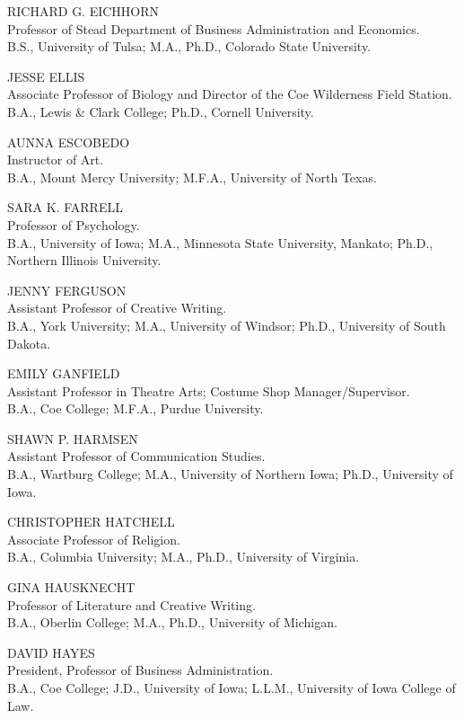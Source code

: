\documentclass[
  letterpaper,
]{scrbook}
\begin{document}
RICHARD G. EICHHORN\\
Professor of Stead Department of Business Administration and
Economics.\\
B.S., University of Tulsa; M.A., Ph.D., Colorado State University.

JESSE ELLIS\\
Associate Professor of Biology and Director of the Coe Wilderness Field
Station.\\
B.A., Lewis \& Clark College; Ph.D., Cornell University.

AUNNA ESCOBEDO\\
Instructor of Art.\\
B.A., Mount Mercy University; M.F.A., University of North Texas.

SARA K. FARRELL\\
Professor of Psychology.\\
B.A., University of Iowa; M.A., Minnesota State University, Mankato;
Ph.D., Northern Illinois University.

JENNY FERGUSON\\
Assistant Professor of Creative Writing.\\
B.A., York University; M.A., University of Windsor; Ph.D., University of
South Dakota.

EMILY GANFIELD\\
Assistant Professor in Theatre Arts; Costume Shop Manager/Supervisor.\\
B.A., Coe College; M.F.A., Purdue University.

SHAWN P. HARMSEN\\
Assistant Professor of Communication Studies.\\
B.A., Wartburg College; M.A., University of Northern Iowa; Ph.D.,
University of Iowa.

CHRISTOPHER HATCHELL\\
Associate Professor of Religion.\\
B.A., Columbia University; M.A., Ph.D., University of Virginia.

GINA HAUSKNECHT\\
Professor of Literature and Creative Writing.\\
B.A., Oberlin College; M.A., Ph.D., University of Michigan.

DAVID HAYES\\
President, Professor of Business Administration.\\
B.A., Coe College; J.D., University of Iowa; L.L.M., University of Iowa
College of Law.
\end{document}
